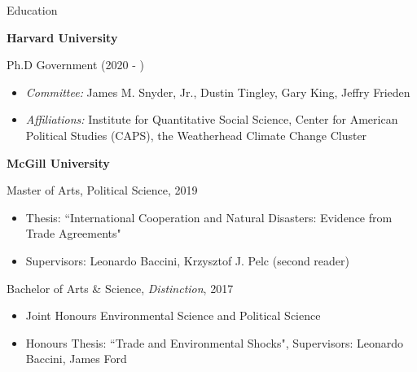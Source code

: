 \documentclass{resume}
\providecommand{\NewEntry}[2]{
  \textbf{#1} \hfill #2\\
}
\begin{document}

\begin{rSection}{\Large E\MakeLowercase{ducation}}

{\bf Harvard University} \hfill {\em } 

Ph.D Government (2020 - ) \hfill { } 

{\vspace{-\baselineskip}
\begin{itemize}[topsep=0pt]
\medskip
    \item[] \textit{Committee:} James M. Snyder, Jr., Dustin Tingley, Gary King, Jeffry Frieden 
   \item[] \textit{Affiliations:} Institute for Quantitative Social Science, Center for American Political Studies (CAPS), the Weatherhead Climate Change Cluster
\end{itemize}}

\bigskip

{\bf McGill University} \hfill {\em } 


Master of Arts, Political Science, 2019 \hfill { } 
{\vspace{-\baselineskip}
\begin{itemize}[topsep=0pt]
 \medskip
  \item[] Thesis: ``International Cooperation and Natural Disasters: Evidence from Trade Agreements"
    \vspace{-\baselineskip}
     \medskip
  \item[] Supervisors: Leonardo Baccini, Krzysztof J. Pelc (second reader)
      \vspace{-\baselineskip}
     \medskip
\end{itemize}}

\medskip
\smallskip

Bachelor of Arts \& Science, \textit{Distinction}, 2017
{\vspace{-\baselineskip}
\medskip
\begin{itemize}[topsep=0pt]
  \setlength\itemsep{-0.7em}
  \item[] Joint Honours Environmental Science and Political Science
  \item[] Honours Thesis: ``Trade and Environmental Shocks", Supervisors: Leonardo Baccini, James Ford
\end{itemize}}




\end{rSection}
\end{document}
